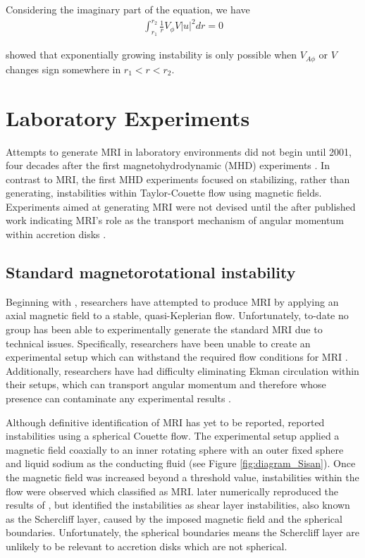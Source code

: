 \documentclass{jfm}
\begin{document}
Considering the imaginary part of the equation, we have 
\begin{align}
    \int_{r_1}^{r_2} \frac{1}{r}V_\phi V |u|^2 dr =0
\end{align}

\cite{Knobloch1992} showed that exponentially growing instability is only possible 
when $V_{A\phi}$ or $V$ changes sign somewhere in $r_1< r < r_2$.



\section{Laboratory Experiments}
\label{sec:experiments}

Attempts to generate MRI in laboratory environments did not begin until 2001,
four decades after the first magnetohydrodynamic (MHD) experiments
\citep{Donnelly1960}. In contrast to MRI, the first MHD experiments focused on
stabilizing, rather than generating, instabilities within Taylor-Couette flow
using magnetic fields. Experiments aimed at generating MRI were not devised
until the after published work indicating MRI's role as the transport mechanism
of angular momentum within accretion disks \citep{Balbus1998}.

%
%
\subsection{Standard magnetorotational instability}
\label{sec:standard_mri}
Beginning with \cite{Ji2001}, researchers have attempted to produce MRI by
applying an axial magnetic field to a stable, quasi-Keplerian flow.
Unfortunately, to-date no group has been able to experimentally generate the
standard MRI due to technical issues. Specifically, researchers have been
unable to create an experimental setup which can withstand the required flow
conditions for MRI \citep{Ji2001, Ji2002}. Additionally, researchers have had
difficulty eliminating Ekman circulation within their setups, which can
transport angular momentum and therefore whose presence can contaminate any
experimental results \citep{Kageyama2004}.

Although definitive identification of MRI has yet to be reported,
\cite{Sisan2004} reported instabilities using a spherical Couette flow. The
experimental setup applied a magnetic field coaxially to an inner rotating
sphere with an outer fixed sphere and liquid sodium as the conducting fluid
(see Figure \ref{fig:diagram_Sisan}).  Once the magnetic field was increased
beyond a threshold value, instabilities within the flow were observed which
\cite{Sisan2004} classified as MRI.  \cite{Gissinger2011} later numerically
reproduced the results of \cite{Sisan2004}, but identified the instabilities as
shear layer instabilities, also known as the Schercliff layer, caused by the
imposed magnetic field and the spherical boundaries.  Unfortunately, the
spherical boundaries means the Schercliff layer are unlikely to be relevant to
accretion disks which are not spherical.
\end{document}
